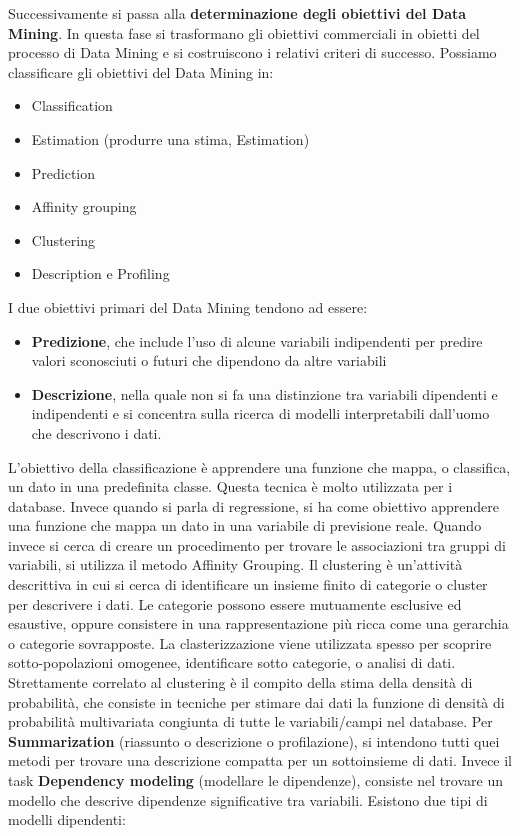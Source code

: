 \documentclass[a4paper]{extarticle}
\begin{document}
Successivamente si passa alla \textbf{determinazione degli obiettivi del Data Mining}. In questa fase si trasformano gli obiettivi commerciali in obietti del processo di Data Mining e si costruiscono i relativi criteri di successo. Possiamo classificare gli obiettivi del Data Mining in:
\begin{itemize}
\item Classification
\item Estimation (produrre una stima, Estimation)
\item Prediction
\item Affinity grouping
\item Clustering
\item Description e Profiling
\end{itemize}

I due obiettivi primari del Data Mining tendono ad essere:
\begin{itemize}
\item \textbf{Predizione}, che include l'uso di alcune variabili indipendenti per predire valori sconosciuti o futuri che dipendono da altre variabili
\item \textbf{Descrizione}, nella quale non si fa una distinzione tra variabili dipendenti e indipendenti e si concentra sulla ricerca di modelli interpretabili dall'uomo che descrivono i dati.
\end{itemize}
L'obiettivo della classificazione è apprendere una funzione che mappa, o classifica, un dato in una predefinita classe. Questa tecnica è molto utilizzata per i database. Invece quando si parla di regressione, si ha come obiettivo apprendere una funzione che mappa un dato in una variabile di previsione reale. Quando invece si cerca di creare un procedimento per trovare le associazioni tra gruppi di variabili, si utilizza il metodo Affinity Grouping. Il clustering è un'attività descrittiva in cui si cerca di identificare un insieme finito di categorie o cluster per descrivere i dati. Le categorie possono essere mutuamente esclusive ed esaustive, oppure consistere in una rappresentazione più ricca come una gerarchia o categorie sovrapposte. La clasterizzazione viene utilizzata spesso per scoprire sotto-popolazioni omogenee, identificare sotto categorie, o analisi di dati. Strettamente correlato al clustering è il compito della stima della densità di probabilità, che consiste in tecniche per stimare dai dati la funzione di densità di probabilità multivariata congiunta di tutte le variabili/campi nel database.
Per \textbf{Summarization} (riassunto o descrizione o profilazione), si intendono tutti quei metodi per trovare una descrizione compatta per un sottoinsieme di dati. Invece il task \textbf{Dependency modeling} (modellare le dipendenze), consiste nel trovare un modello che descrive dipendenze significative tra variabili. Esistono due tipi di modelli dipendenti:
\end{document}
